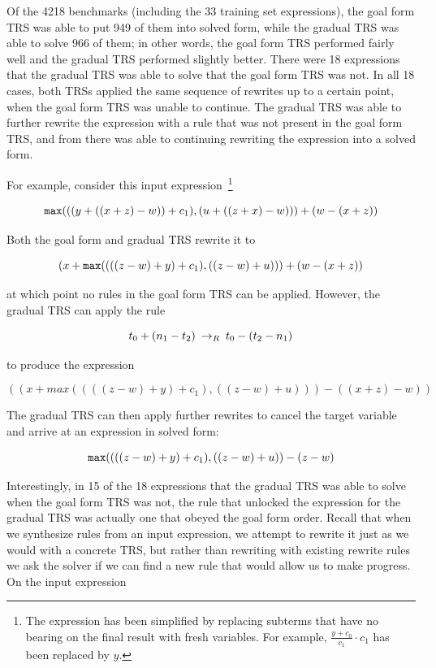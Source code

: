 Of the 4218 benchmarks (including the 33 training set expressions), the goal form TRS was able to put 949 of them into solved form, while the gradual TRS was able to solve 966 of them; in other words, the goal form TRS performed fairly well and the gradual TRS performed slightly better. There were 18 expressions that the gradual TRS was able to solve that the goal form TRS was not. In all 18 cases, both TRSs applied the same sequence of rewrites up to a certain point, when the goal form TRS was unable to continue. The gradual TRS was able to further rewrite the expression with a rule that was not present in the goal form TRS, and from there was able to continuing rewriting the expression into a solved form.

For example, consider this input expression~\footnote{The expression has been simplified by replacing subterms that have no bearing on the final result with fresh variables. For example, $\frac{y + c_0}{c_1} \cdot c_1$ has been replaced by $y$.}

\[ \texttt{max}{(((y + ((x + z) - w)) + c_1), (u + ((z + x) - w)))} + (w - (x + z))
\]

Both the goal form and gradual TRS rewrite it to

\[ (x + \texttt{max}{((((z - w) + y) + c_1), ((z - w) + u))}) + (w - (x + z))
\]

at which point no rules in the goal form TRS can be applied. However, the gradual TRS can apply the rule

\[ t_0 + (n_1 - t_2) \:\rightarrow_{R}\: t_0 - (t_2 - n_1)
\]

to produce the expression

\[ ((x + max((((z - w) + y) + c_1), ((z - w) + u))) - ((x + z) - w))
\]

The gradual TRS can then apply further rewrites to cancel the target variable and arrive at an expression in solved form:

\[ \texttt{max}{((((z - w) + y) + c_1), ((z - w) + u))} - (z - w)
\]

Interestingly, in 15 of the 18 expressions that the gradual TRS was able to solve when the goal form TRS was not, the rule that unlocked the expression for the gradual TRS was actually one that obeyed the goal form order. Recall that when we synthesize rules from an input expression, we attempt to rewrite it just as we would with a concrete TRS, but rather than rewriting with existing rewrite rules we ask the solver if we can find a new rule that would allow us to make progress. On the input expression

